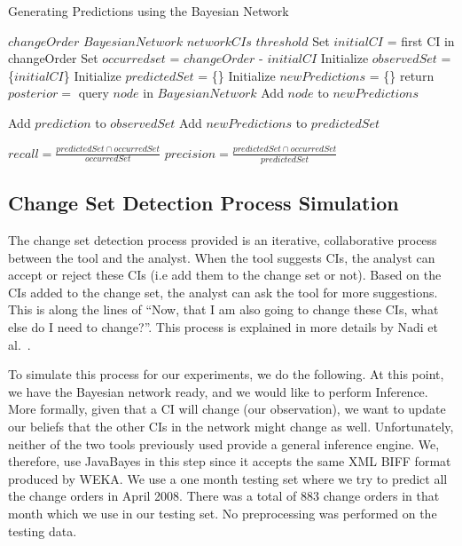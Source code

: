 \documentclass[10pt,twocolumn,letterpaper]{article}
\begin{document}
\begin{algorithm}[tb]
   \caption{Generating Predictions using the Bayesian Network}
   \label{alg:simulation}
\begin{algorithmic}
    $changeOrder$
     $BayesianNetwork$
 $networkCIs$ 
     $threshold$
    \STATE Set $initialCI$ = first CI in changeOrder
    \STATE Set $occurredset$ = $changeOrder$ - $initialCI$
    \STATE Initialize $observedSet$ = \{$initialCI$\}
    \STATE Initialize $predictedSet$ = \{\}
   \REPEAT  
    \STATE Initialize $newPredictions$ = \{\}
\STATE return 
\ENDIF
    \STATE $posterior =$ query $node$ in $BayesianNetwork$ 
      \STATE Add $node$ to $newPredictions$   
    \ENDIF
    \ENDFOR

      \STATE Add $prediction$ to $observedSet$
    \ENDIF
    \ENDFOR
\STATE Add $newPredictions$ to $predictedSet$

\newline
\STATE $recall=  \frac{predictedSet\cap occurredSet}{occurredSet}$
\newline
\STATE $precision = \frac{predictedSet\cap occurredSet}{predictedSet} $
\end{algorithmic}
\end{algorithm}

\subsection{Change Set Detection Process Simulation}

The change set detection process provided is an iterative, collaborative process between the tool and the analyst. When the tool suggests CIs, the analyst can
accept or reject these CIs (i.e add them to the change set or not). Based on the CIs added to the change set, the analyst can ask the tool for more
suggestions. This is along the lines of ``Now, that I am also going to change these CIs, what else do I need to change?''. This process is explained in more
details by Nadi et al.~\cite{nadi2010}.

To simulate this process for our experiments, we do the following. At this point, we have the Bayesian network ready, and we would like to perform Inference.
More formally, given that a CI will change (our observation), we want to update our beliefs that the other CIs in the network might change as well.
Unfortunately, neither of the two tools previously used provide a general inference engine. We, therefore, use JavaBayes in this step since it accepts
the same XML BIFF format produced by WEKA. We use a one month testing set where we try to predict all the change orders in April 2008. There was a total of
883 change orders in that month which we use in our testing set. No preprocessing was performed on the testing data.
\end{document}
